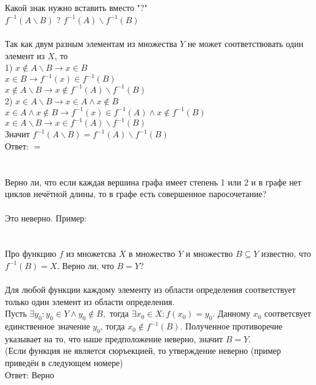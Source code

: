 \documentclass{article}
\begin{document}
\section{}
Какой знак нужно вставить вместо "?"\\
$f^{-1}(A\backslash B)$ ? $f^{-1}(A) \backslash f^{-1}(B)$\\
\\Так как двум разным элементам из множества $Y$ не может соответствовать один элемент из $X$, то\\
1) $x \notin A \backslash B \longrightarrow x \in B$\\
$x \in B \longrightarrow f^{-1}(x) \in f^{-1}(B)$\\
$x \notin A \backslash B \longrightarrow x \notin f^{-1}(A) \backslash f^{-1}(B)$\\
2) $x \in A \backslash B \longrightarrow x \in A \wedge x \notin B$\\
$x \in A \wedge x \notin B \longrightarrow f^{-1}(x) \in f^{-1}(A) \wedge x \notin f^{-1}(B)$\\
$x \in A \backslash B \longrightarrow x \in f^{-1}(A) \backslash f^{-1}(B)$\\
Значит $f^{-1}(A\backslash B) = f^{-1}(A) \backslash f^{-1}(B)$\\
Ответ: $=$
\section{}
Верно ли, что если каждая вершина графа имеет степень 1 или 2 и в графе нет циклов нечётной длины, то в графе есть совершенное паросочетание?\\\\
Это неверно. Пример:\\
\section{}
Про функцию $f$ из множетсва $X$ в множество $Y$ и множество $B \subseteq Y$ известно, что $f^{-1}(B)=X.$ Верно ли, что $B=Y$?\\\\
Для любой функции каждому элементу из области определения соответствует только один элемент из области определения.\\
Пусть $\exists y_0: y_0 \in Y \wedge y_0\notin B,$ тогда $\exists x_0 \in X: f(x_0) = y_0$. Данному $x_0$ соответсвует единственное значение $y_0$, тогда $x_0 \notin f^{-1}(B)$. Полученное противоречие указывает на то, что наше предположение неверно, значит $B=Y$.\\
(Если функция не является сюръекцией, то утверждение неверно (пример приведён в следующем номере)\\
Ответ: Верно
\end{document}
